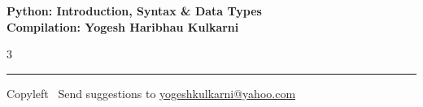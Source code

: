 \documentclass[8pt,landscape]{article}
\begin{document}
\footnotesize


\begin{center}
\Large{\textbf{Python: Introduction, Syntax \& Data Types\\ Compilation: Yogesh Haribhau Kulkarni}}
\end{center}

\begin{multicols}{3}

\end{multicols}

\rule{\linewidth}{0.25pt}
\scriptsize
Copyleft \textcopyleft\  Send suggestions to
\href{http://www.yogeshkulkarni.com}{yogeshkulkarni@yahoo.com}
\end{document}
